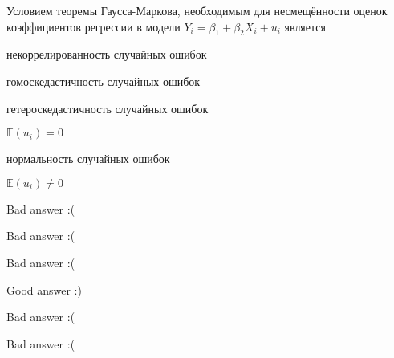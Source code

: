 
\begin{question}
Условием теоремы Гаусса-Маркова, необходимым для несмещённости оценок
коэффициентов регрессии в модели \(Y_i = \beta_1 + \beta_2 X_i + u_i\) является
\begin{answerlist}
  \item некоррелированность случайных ошибок
  \item гомоскедастичность случайных ошибок
  \item гетероскедастичность случайных ошибок
  \item \(\mathbb{E}(u_i)=0\)
  \item нормальность случайных ошибок
  \item \(\mathbb{E}(u_i)\neq 0\)
\end{answerlist}
\end{question}

\begin{solution}
\begin{answerlist}
  \item Bad answer :(
  \item Bad answer :(
  \item Bad answer :(
  \item Good answer :)
  \item Bad answer :(
  \item Bad answer :(
\end{answerlist}
\end{solution}

